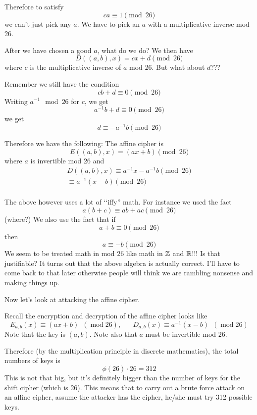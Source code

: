 


Therefore to
satisfy
\[
ca \equiv 1 \pmod{26}
\]
we can't just pick any $a$.
We have to pick an $a$ with a multiplicative inverse mod 26.

After we have chosen a good $a$, what do we do?
We then have
\[
  D((a,b), x) = cx + d \pmod{26}
\]
where $c$ is the multiplicative inverse of $a$ mod 26.
But what about $d$???

Remember we still have the condition
\[
cb + d \equiv 0 \pmod{26}
\]
Writing $a^{-1} \mod 26$ for $c$, we get
\[
a^{-1}b + d \equiv 0 \pmod{26}
\]
we get
\[
d \equiv -a^{-1}b \pmod{26}
\]

Therefore we have the following:
The affine cipher is
\[
E((a,b), x) = (ax + b) \pmod{26}
\]
where $a$ is invertible mod 26 and
\begin{align*}
  D((a,b), x)
  \equiv a^{-1}x - a^{-1}b\pmod{26} \\
  \equiv a^{-1}(x - b)\pmod{26} \\
\end{align*}




The above however uses a lot of \lq\lq iffy'' math.
For instance we used the fact
\[
  a(b + c) \equiv ab + ac \pmod{26}
\]
(where?)
We also use the fact that if 
\[
  a + b \equiv 0 \pmod{26}
\]
then
\[
  a \equiv -b \pmod{26}
\]
We seem to be treated math in mod 26 like math in $\mathbb Z$
and $\mathbb R$!!!
Is that justifiable?
It turns out that the above algebra is actually correct.
I'll have to come back to that later otherwise people will think
we are rambling nonsense and making things up.



Now let's look at attacking the affine cipher.

Recall the encryption and decryption of the affine cipher looks
like
\[
 E_{a,b}(x) \equiv (ax + b) \,\,\,(\operatorname{mod} 26),
 \,\,\,\,\,\,\,\,\,\,
 D_{a,b}(x) \equiv a^{-1}(x - b) \,\,\,(\operatorname{mod} 26)
\]
Note that the key is $(a,b)$. 
Note also that $a$ must be invertible mod 26.

Therefore (by the multiplication principle in discrete mathematics),
the total numbers of keys is
\[
\phi(26) \cdot 26 = 312
\]
This is not that big, but it's definitely bigger than the number of keys
for the shift cipher (which is 26).
This means that to carry out a brute force attack on an affine
cipher, assume the attacker has the cipher,
he/she must try 312 possible keys.

